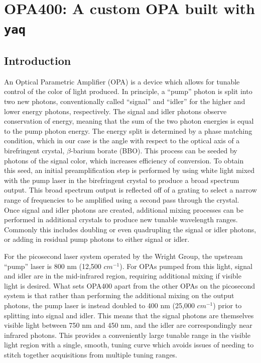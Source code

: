 \chapter{OPA400: A custom OPA built with \texttt{yaq}} \label{cha:opa400}

\clearpage

\section{Introduction}  %

An Optical Parametric Amplifier (OPA) is a device which allows for tunable control of the color of light produced.
In principle, a ``pump'' photon is split into two new photons, conventionally called ``signal'' and ``idler'' for the higher and lower energy photons, respectively.
The signal and idler photons observe conservation of energy, meaning that the sum of the two photon energies is equal to the pump photon energy.
The energy split is determined by a phase matching condition, which in our case is the angle with respect to the optical axis of a birefringent crystal, $\beta$-barium borate (BBO).
This process can be seeded by photons of the signal color, which increases efficiency of conversion.
To obtain this seed, an initial preamplification step is performed by using white light mixed with the pump laser in the birefringent crystal to produce a broad spectrum output.
This broad spectrum output is reflected off of a grating to select a narrow range of frequencies to be amplified using a second pass through the crystal.
Once signal and idler photons are created, additional mixing processes can be performed in additional crystals to produce new tunable wavelength ranges.
Commonly this includes doubling or even quadrupling the signal or idler photons, or adding in residual pump photons to either signal or idler.

For the picosecond laser system operated by the Wright Group, the upstream ``pump'' laser is 800 nm (12,500 $cm^{-1}$).
For OPAs pumped from this light, signal and idler are in the mid-infrared region, requiring additional mixing if visible light is desired.
What sets OPA400 apart from the other OPAs on the picosecond system is that rather than performing the additional mixing on the output photons, the pump laser is instead doubled to 400 nm (25,000 $cm^{-1}$) prior to splitting into signal and idler.
This means that the signal photons are themselves visible light between 750 nm and 450 nm, and the idler are correspondingly near infrared photons.
This provides a conveniently large tunable range in the visible light region with a single, smooth, tuning curve which avoids issues of needing to stitch together acquisitions from multiple tuning ranges.

